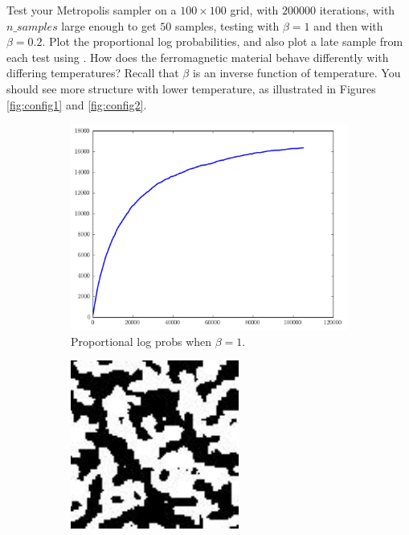 \begin{problem}
Test your Metropolis sampler on a $100 \times 100$ grid, with $200000$ iterations, with $n\_samples$ large enough to get $50$ samples, testing with $\beta = 1$ and then with $\beta = 0.2$. Plot the proportional log probabilities, and also plot a late sample from each test using . How does the ferromagnetic material behave differently with differing temperatures? Recall that $\beta$ is an inverse function of temperature. You should see more structure with lower temperature, as illustrated in Figures \ref{fig:config1} and \ref{fig:config2}.
\end{problem}

\begin{figure}
	\begin{subfigure}[b]{.49\textwidth}
		\centering
		\includegraphics[width=\textwidth]{beta1_logprobs.pdf}
		\caption{Proportional log probs when $\beta = 1$.}
		\label{fig:lprobs1}
	\end{subfigure}
	\begin{subfigure}[b]{.49\textwidth}
		\centering
		\includegraphics[width=.75\textwidth]{beta1.pdf}

\end{subfigure}
\end{figure}
